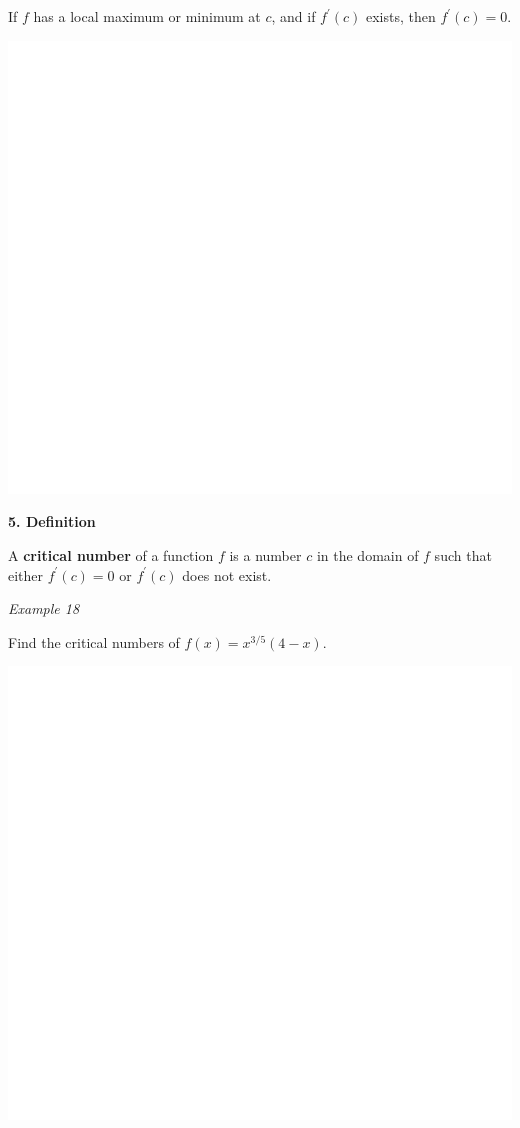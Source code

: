 \documentclass[]{book}
\begin{document}
If \(f\) has a local maximum or minimum at \(c\), and if \(f^\prime(c)\) exists, then \(f^\prime(c) = 0.\)

\begin{center}\includegraphics[width=1\linewidth]{figure/LB32-1} \end{center}

\newpage

\newpage

\textbf{5. Definition}

A \textbf{critical number} of a function \(f\) is a number \(c\) in the domain of \(f\) such that either \(f^\prime(c) = 0\) or \(f^\prime(c)\) does not exist.

\emph{Example 18}

Find the critical numbers of \(f(x)=x^{3/5}(4-x).\)

\begin{center}\includegraphics[width=1\linewidth]{figure/LB33-1} \end{center}
\end{document}
